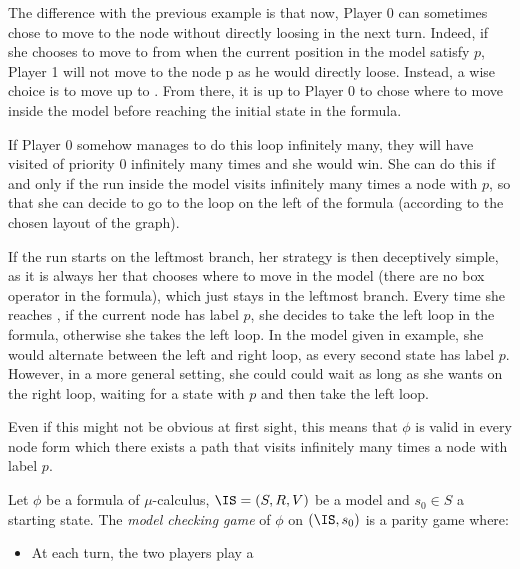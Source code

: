 The difference with the previous example is that now, Player 0
can sometimes chose to move to the node \State{\wedge}
without directly loosing in the next turn.
Indeed, if she chooses to move to \State{\wedge}
from \State\vee when the current position in the model satisfy $p$,
Player 1 will not move to the node \State p as he would directly loose.
Instead, a wise choice is to move up to \State{\diam{}}.
From there, it is up to Player 0 to chose where to move inside the model
before reaching the initial state \State\nu in the formula.

If Player 0 somehow manages to do this loop infinitely many,
they will have visited \State\nu of priority 0 infinitely many times
and she would win.
She can do this if and only if the run inside the model visits infinitely many
times a node with $p$, so that she can decide to go to the loop on the left of the
formula (according to the chosen layout of the graph).

If the run starts on the leftmost branch, her strategy is then deceptively simple,
as it is always her that chooses where to move in the model (there are no box operator in the formula),
which just stays in the leftmost branch. Every time she reaches \State\vee,
if the current node has label $p$, she decides to take the left loop in
the formula, otherwise she takes the left loop.
In the model given in example, she would alternate between the left and right loop,
as every second state has label $p$. However, in a more general setting,
she could could wait as long as she wants on the right loop, waiting for a state
with $p$ and then take the left loop.

Even if this might not be obvious at first sight,
this means that $\phi$ is valid in every node
form which there exists
a path that visits infinitely many times a node with label $p$.




\begin{definition}
    Let $\phi$ be a formula of $\mu$-calculus,
    $\IS = (S, R, V)$ be a model and $s_0 \in S$ a starting state.
    The \emph{model checking game} of $\phi$ on $(\IS, s_0)$
    is a parity game where:
    \begin{itemize}
        \item At each turn, the two players play a
    \end{itemize}
\end{definition}



















\newpage
\nocite{*}



